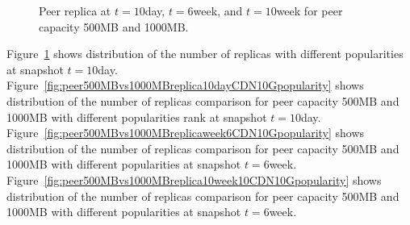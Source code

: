 \documentclass[conference]{IEEEtran}
\begin{document}
\begin{figure}[!htb]
\centering
{}
\hfill
{}
\caption{Peer replica at $t=10$day, $t=6$week, and $t=10$week for peer capacity 500MB and 1000MB.}
\label{fig:replicaatbypopularity}
\vspace{-2mm}
\end{figure}

Figure~\ref{fig:replicaatbypopularity} shows distribution of the number of replicas with different popularities at snapshot $t=10$day.
Figure~\ref{fig:peer500MBvs1000MBreplica10dayCDN10Gpopularity} shows distribution of the number of replicas comparison for peer capacity 500MB and 1000MB with different popularities rank at snapshot $t=10$day.
Figure~\ref{fig:peer500MBvs1000MBreplicaweek6CDN10Gpopularity} shows distribution of the number of replicas comparison for peer capacity 500MB and 1000MB with different popularities at snapshot $t=6$week.
Figure~\ref{fig:peer500MBvs1000MBreplica10week10CDN10Gpopularity} shows distribution of the number of replicas comparison for peer capacity 500MB and 1000MB with different popularities at snapshot $t=6$week.
\end{document}
